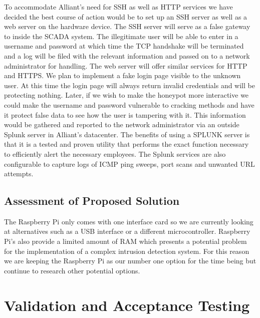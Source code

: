 To accommodate Alliant’s need for SSH as well as HTTP services we have decided the best course of action would be to set up an
SSH server as well as a web server on the hardware device.  The SSH server will serve as a false gateway to inside the SCADA 
system.  The illegitimate user will be able to enter in a username and password at which time the TCP handshake will be terminated
and a log will be filed with the relevant information and passed on to a network administrator for handling.  The web server will
offer similar services for HTTP and HTTPS.  We plan to implement a fake login page visible to the unknown user.  At this time the
login page will always return invalid credentials and will be protecting nothing.  Later, if we wish to make the honeypot more
interactive we could make the username and password vulnerable to cracking methods and have it protect false data to see how the
user is tampering with it.  This information would be gathered and reported to the network administrator via an outside Splunk
server in Alliant’s datacenter.  The benefits of using a SPLUNK server is that it is a tested and proven utility that performs
the exact function necessary to efficiently alert the necessary employees.  The Splunk services are also configurable to capture
logs of ICMP ping sweeps, port scans and unwanted URL attempts.   

\subsection{Assessment of Proposed Solution}

The Raspberry Pi only comes with one interface card so we are currently looking at alternatives such as a USB interface or a different microcontroller.
Raspberry Pi’s also provide a limited amount of RAM which presents a potential problem for the implementation of a complex
intrusion detection system.  For this reason we are keeping the Raspberry Pi as our number one option for the time being but
continue to research other potential options.

\section{Validation and Acceptance Testing}

